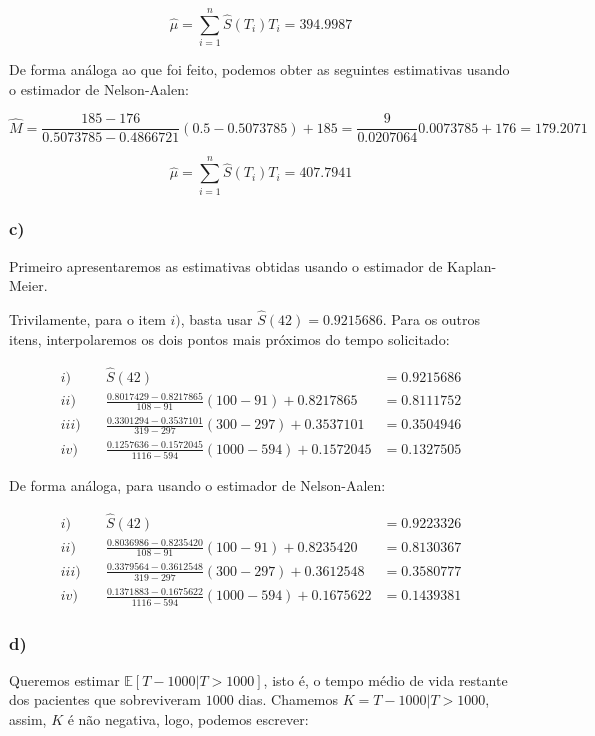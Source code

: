 \documentclass[
]{article}
\begin{document}
\[\widehat{\mu}=\sum_{i=1}^n\widehat{S}(T_i)T_i=394.9987\]

De forma análoga ao que foi feito, podemos obter as seguintes
estimativas usando o estimador de Nelson-Aalen:

\[\widehat{M}=\frac{185-176}{0.5073785-0.4866721}(0.5-0.5073785)+185=\frac{9}{0.0207064}0.0073785+176=179.2071\]

\[\widehat{\mu}=\sum_{i=1}^n\widehat{S}(T_i)T_i=407.7941\]

\hypertarget{c}{%
\subsubsection{c)}\label{c}}

Primeiro apresentaremos as estimativas obtidas usando o estimador de
Kaplan-Meier.

Trivilamente, para o item \(i)\), basta usar
\(\widehat{S}(42)=0.9215686\). Para os outros itens, interpolaremos os
dois pontos mais próximos do tempo solicitado:

\[
\begin{aligned}
i)\quad & \widehat{S}(42) &=0.9215686\\
ii)\quad &\frac{0.8017429-0.8217865}{108-91}(100-91)+0.8217865 &=0.8111752\\
iii)\quad &\frac{0.3301294-0.3537101}{319-297}(300-297)+0.3537101 &=0.3504946\\
iv)\quad &\frac{0.1257636-0.1572045}{1116-594}(1000-594)+0.1572045 &=0.1327505
\end{aligned}
\]

De forma análoga, para usando o estimador de Nelson-Aalen:

\[
\begin{aligned}
i)\quad & \widehat{S}(42) &=0.9223326\\
ii)\quad &\frac{0.8036986-0.8235420}{108-91}(100-91)+0.8235420 &=0.8130367\\
iii)\quad &\frac{0.3379564-0.3612548}{319-297}(300-297)+0.3612548 &=0.3580777\\
iv)\quad &\frac{0.1371883-0.1675622}{1116-594}(1000-594)+0.1675622 &=0.1439381
\end{aligned}
\]

\hypertarget{d}{%
\subsubsection{d)}\label{d}}

Queremos estimar \(\mathbb{E}[T-1000|T>1000]\), isto é, o tempo médio de
vida restante dos pacientes que sobreviveram \(1000\) dias. Chamemos
\(K=T-1000|T>1000\), assim, \(K\) é não negativa, logo, podemos
escrever:
\end{document}
